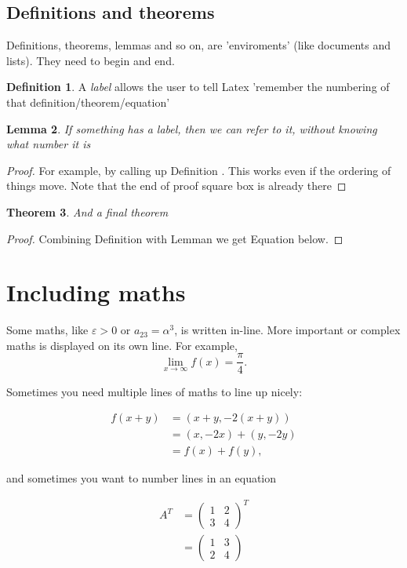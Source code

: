 \documentclass[a4paper,11pt]{article}
\newtheorem{theorem}{Theorem}[section]
\newtheorem{lemma}[theorem]{Lemma}
\theoremstyle{definition}
\newtheorem{definition}[theorem]{Definition}
\begin{document}
\subsection{Definitions and theorems}

Definitions, theorems, lemmas and so on, are 'enviroments' (like documents and lists). They need to begin and end.

\begin{definition}\label{my_def}
	A \emph{label} allows the user to tell Latex 'remember the numbering of that definition/theorem/equation'
\end{definition}

\begin{lemma} \label{my_lem}
	If something has a label, then we can refer to it, without knowing what number it is 
\end{lemma}

\begin{proof}
	For example, by calling up Definition . This works even if the ordering of things move.
	Note that the end of proof square box is already there
\end{proof}

\begin{theorem}
	And a final theorem
\end{theorem}

\begin{proof}
	Combining Definition  with Lemman we get Equation  below.
\end{proof}

\section{Including maths}

Some maths, like $\varepsilon>0$ or $a_{23}=\alpha^3$, is written in-line. More important or complex maths is displayed on its own line.
For example, $$ \lim_{x\to\infty}f(x)=\frac{\pi}{4}.$$

Sometimes you need multiple lines of maths to line up nicely:

\begin{align*}
f(x+y)&=(x+y,-2(x+y))\\
&=(x,-2x)+(y,-2y)\\
&=f(x)+f(y),
\end{align*}

and sometimes you want to number lines in an equation

\begin{align}
A^{T} & =\begin{pmatrix}1 & 2\\
3 & 4
\end{pmatrix}^{T}\\
\label{my_eqn}  & =\begin{pmatrix}1 & 3\\
2 & 4
\end{pmatrix}
\end{align}
\end{document}
